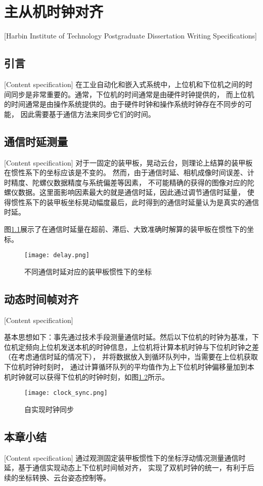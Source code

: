 \chapter[主从机时钟对齐]{主从机时钟对齐}[Harbin Institute of Technology Postgraduate Dissertation Writing Specifications]

\section{引言}[Content specification]
在工业自动化和嵌入式系统中，上位机和下位机之间的时间同步是非常重要的。通常，下位机的时间通常是由硬件时钟提供的，
而上位机的时间通常是由操作系统提供的。由于硬件时钟和操作系统时钟存在不同步的可能，
因此需要基于通信方法来同步它们的时间。\par

\section{通信时延测量}[Content specification]
对于一固定的装甲板，晃动云台，则理论上结算的装甲板在惯性系下的坐标应该是不变的。
然而，由于通信时延、相机成像时间误差、计时精度、陀螺仪数据精度与系统偏差等因素，
不可能精确的获得的图像对应的陀螺仪数据。这里面影响因素最大的就是通信时延，因此通过调节通信时延量，
使得惯性系下的装甲板坐标晃动幅度最后，此时得到的通信时延量认为是真实的通信时延。
\par
图\ref{delay}展示了在通信时延量在超前、滞后、大致准确时解算的装甲板在惯性下的坐标。
\begin{figure}[H]
    \centering
    \texttt{[image: delay.png]} 
    \caption{不同通信时延对应的装甲板惯性下的坐标} 
    \label{delay}
\end{figure}

\section{动态时间帧对齐}[Content specification]

基本思想如下：事先通过技术手段测量通信时延。然后以下位机的时钟为基准，下位机定频向上位机发送本机的时钟信息，上位机将计算本机时钟与下位机时钟之差（在考虑通信时延的情况下），
并将数据放入到循环队列中，当需要在上位机获取下位机时钟时刻时，
通过计算循环队列的平均值作为上下位机时钟偏移量加到本机时钟就可以获得下位机的时钟时刻，如图\ref{clock_sync}所示。

\begin{figure}[H]
    \centering
    \texttt{[image: clock\_sync.png]} 
    \caption{自实现时钟同步} 
    \label{clock_sync}
\end{figure}









\section{本章小结}[Content specification]
通过观测固定装甲板惯性下的坐标浮动情况测量通信时延，基于通信实现动态上下位机时间帧对齐，
实现了双机时钟的统一，有利于后续的坐标转换、云台姿态控制等。






